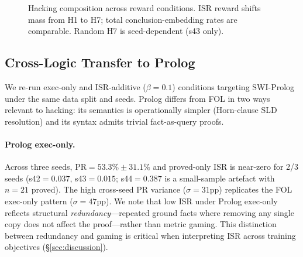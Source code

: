 \begin{figure}[t]
  \centering
  \caption{Hacking composition across reward conditions. ISR reward shifts mass from H1 to H7; total conclusion-embedding rates are comparable. Random H7 is seed-dependent (s43 only).}
  \label{fig:hacking-composition}
\end{figure}

\subsection{Cross-Logic Transfer to Prolog}
\label{sec:exp-cross-logic}

We re-run exec-only and ISR-additive ($\beta{=}0.1$) conditions targeting SWI-Prolog under the same data split and seeds.
Prolog differs from FOL in two ways relevant to hacking: its semantics is operationally simpler (Horn-clause SLD resolution) and its syntax admits trivial fact-as-query proofs.

\paragraph{Prolog exec-only.}
Across three seeds, $\mathrm{PR}{=}53.3\%{\pm}31.1\%$ and proved-only ISR is near-zero for 2/3 seeds (s42${=}0.037$, s43${=}0.015$; s44${=}0.387$ is a small-sample artefact with $n{=}21$ proved).
The high cross-seed PR variance ($\sigma{=}31$pp) replicates the FOL exec-only pattern ($\sigma{=}47$pp).
We note that low ISR under Prolog exec-only reflects structural \emph{redundancy}---repeated ground facts where removing any single copy does not affect the proof---rather than metric gaming.
This distinction between redundancy and gaming is critical when interpreting ISR across training objectives (\S\ref{sec:discussion}).


